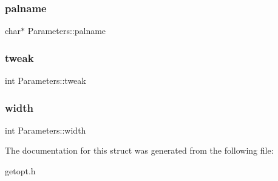\subsubsection{\texorpdfstring{palname}{palname}}
{\footnotesize\ttfamily char$\ast$ Parameters\+::palname}

\mbox{\label{struct_parameters_a1962cf70d9f60c9b1b6d567a0152776b}} 
\subsubsection{\texorpdfstring{tweak}{tweak}}
{\footnotesize\ttfamily int Parameters\+::tweak}

\mbox{\label{struct_parameters_ae8f341732b04b09c84f67f0439efb79d}} 
\subsubsection{\texorpdfstring{width}{width}}
{\footnotesize\ttfamily int Parameters\+::width}



The documentation for this struct was generated from the following file\+:\begin{DoxyCompactItemize}
\item 
getopt.\+h\end{DoxyCompactItemize}

